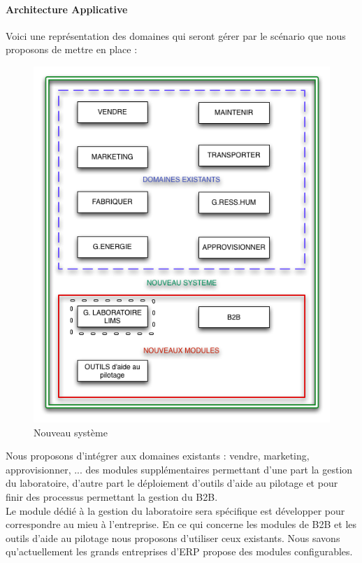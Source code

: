 \paragraph{Architecture Applicative}
Voici une représentation des domaines qui seront gérer par le scénario que nous proposons de mettre en place :
\begin{figure}[H]
\begin{center}
 \includegraphics[scale=0.5]{ERPsolution.png}
  \caption{Nouveau système}
\end{center}  
\end{figure}

Nous proposons d'intégrer aux domaines existants : vendre, marketing, approvisionner, ...  des modules supplémentaires permettant d'une part la gestion du laboratoire, d'autre part le déploiement d'outils d'aide au pilotage et pour finir des processus permettant la gestion du B2B.\\
Le module dédié à la gestion du laboratoire sera spécifique est développer pour correspondre au mieu à l'entreprise. En ce qui concerne les modules de B2B et les outils d'aide au pilotage nous proposons d'utiliser 
ceux existants. Nous savons qu'actuellement les grands entreprises d'ERP propose des modules configurables.   
